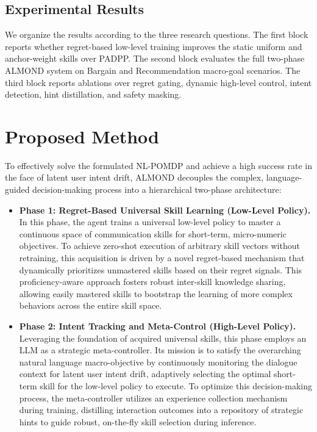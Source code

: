 \documentclass[conference]{IEEEtran}
\begin{document}
\subsection{Experimental Results}

We organize the results according to the three research questions. The first
block reports whether regret-based low-level training improves the static
uniform and anchor-weight skills over PADPP. The second block evaluates the full
two-phase ALMOND system on Bargain and Recommendation macro-goal scenarios. The
third block reports ablations over regret gating, dynamic high-level control,
intent detection, hint distillation, and safety masking.

\iffalse
\section{Proposed Method}

To effectively solve the formulated NL-POMDP and achieve a high success rate in the face of latent user intent drift, ALMOND decouples the complex, language-guided decision-making process into a hierarchical two-phase architecture:

\begin{itemize}
    \item \textbf{Phase 1: Regret-Based Universal Skill Learning (Low-Level Policy).} In this phase, the agent trains a universal low-level policy to master a continuous space of communication skills for short-term, micro-numeric objectives. To achieve zero-shot execution of arbitrary skill vectors without retraining, this acquisition is driven by a novel regret-based mechanism that dynamically prioritizes unmastered skills based on their regret signals. This proficiency-aware approach fosters robust inter-skill knowledge sharing, allowing easily mastered skills to bootstrap the learning of more complex behaviors across the entire skill space.
    
    \item \textbf{Phase 2: Intent Tracking and Meta-Control (High-Level Policy).} Leveraging the foundation of acquired universal skills, this phase employs an LLM as a strategic meta-controller. Its mission is to satisfy the overarching natural language macro-objective by continuously monitoring the dialogue context for latent user intent drift, adaptively selecting the optimal short-term skill for the low-level policy to execute. To optimize this decision-making process, the meta-controller utilizes an experience collection mechanism during training, distilling interaction outcomes into a repository of strategic hints to guide robust, on-the-fly skill selection during inference.
\end{itemize}
\end{document}
